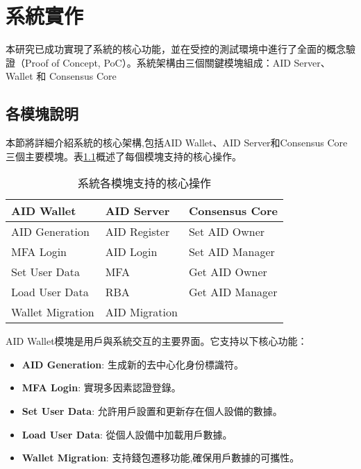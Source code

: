 
\chapter{系統實作}

本研究已成功實現了系統的核心功能，並在受控的測試環境中進行了全面的概念驗證（Proof of Concept, PoC）。系統架構由三個關鍵模塊組成：AID Server、Wallet 和 Consensus Core

\section{各模塊說明}
本節將詳細介紹系統的核心架構,包括AID Wallet、AID Server和Consensus Core三個主要模塊。表\ref{tab:core-operations}概述了每個模塊支持的核心操作。

\begin{table}[htbp]
  \centering
  \caption{系統各模塊支持的核心操作}
  \label{tab:core-operations}
  \begin{tabular}{|l|l|l|}
    \hline
    \textbf{AID Wallet} & \textbf{AID Server} & \textbf{Consensus Core} \\
    \hline
    AID Generation      & AID Register        & Set AID Owner           \\
    MFA Login           & AID Login           & Set AID Manager         \\
    Set User Data       & MFA                 & Get AID Owner           \\
    Load User Data      & RBA                 & Get AID Manager         \\
    Wallet Migration    & AID Migration       &                         \\
    \hline
  \end{tabular}
\end{table}

AID Wallet模塊是用戶與系統交互的主要界面。它支持以下核心功能：
\begin{itemize}
  \item \textbf{AID Generation}: 生成新的去中心化身份標識符。
  \item \textbf{MFA Login}: 實現多因素認證登錄。
  \item \textbf{Set User Data}: 允許用戶設置和更新存在個人設備的數據。
  \item \textbf{Load User Data}: 從個人設備中加載用戶數據。
  \item \textbf{Wallet Migration}: 支持錢包遷移功能,確保用戶數據的可攜性。
\end{itemize}

